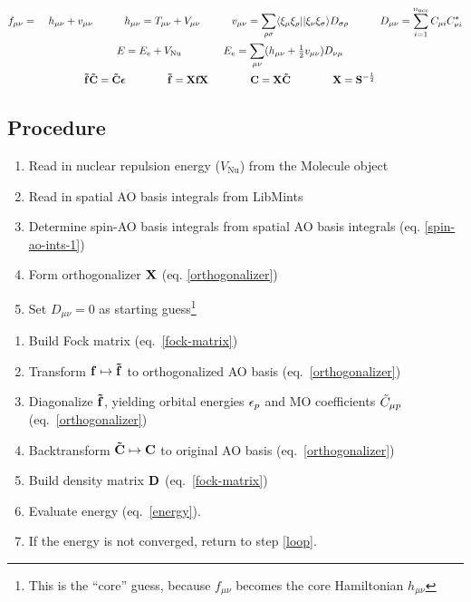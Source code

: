 \documentclass[fleqn]{article}
\begin{document}
\noindent
{}
\begin{gather}
\begin{aligned}
\label{fock-matrix}
&
  f_{\mu\nu}
=&\
  h_{\mu\nu}
+
  v_{\mu\nu}
\hspace{30pt}
  h_{\mu\nu}
=
  T_{\mu\nu}+V_{\mu\nu}
\hspace{30pt}
  v_{\mu\nu}
=
  \sum_{\rho\sigma}
  \langle\xi_\mu\xi_\rho||\xi_\nu\xi_\sigma\rangle
  D_{\sigma\rho}
\hspace{30pt}
  D_{\mu\nu}
=
  \sum_{i=1}^{n_\text{occ}}
  C_{\mu i} C_{\nu i}^*
\end{aligned}\\
\begin{aligned}
\label{energy}
&
  E
=
  E_e
+
  V_\mathrm{Nu}
&&\hspace{30pt}
  E_e
=
  \sum_{\mu\nu}
  (h_{\mu\nu}+\tfrac{1}{2}v_{\mu\nu})D_{\nu\mu}
\end{aligned}\\
\begin{aligned}
\label{orthogonalizer}
&
  \mathbf{\tilde{f}}\mathbf{\tilde{C}}
=
  \mathbf{\tilde{C}}\bm{\epsilon}
&&\hspace{30pt}
  \mathbf{\tilde{f}}
=
  \mathbf{X}\mathbf{f}\mathbf{X}
&&\hspace{30pt}
  \mathbf{C}
=
  \mathbf{X}
  \mathbf{\tilde{C}}
&&\hspace{30pt}
  \mathbf{X}
=
  \mathbf{S}^{-\frac{1}{2}}
\end{aligned}
\end{gather}


\subsection*{Procedure}

\begin{enumerate}
  \item Read in nuclear repulsion energy ($V_\mathrm{Nu}$) from the Molecule object
  \item Read in spatial AO basis integrals from LibMints
  \item Determine spin-AO basis integrals from spatial AO basis integrals (eq. \ref{spin-ao-ints-1})
  \item Form orthogonalizer $\mathbf{X}$ (eq. \ref{orthogonalizer})
  \item Set $D_{\mu\nu}=0$ as starting guess\footnote{This is the ``core'' guess, because $f_{\mu\nu}$ becomes the core Hamiltonian $h_{\mu\nu}$}
\end{enumerate}

\noindent
{}
\begin{enumerate}
  \item\label{loop} Build Fock matrix (eq.~\ref{fock-matrix})
  \item Transform $\mathbf{f}\mapsto\mathbf{\tilde{f}}$ to orthogonalized AO basis (eq.~\ref{orthogonalizer})
  \item Diagonalize $\mathbf{\tilde{f}}$, yielding orbital energies $\epsilon_p$ and MO coefficients $\tilde{C}_{\mu p}$ (eq.~\ref{orthogonalizer})
  \item Backtransform $\mathbf{\tilde{C}}\mapsto\mathbf{C}$ to original AO basis (eq.~\ref{orthogonalizer})
  \item Build density matrix $\mathbf{D}$ (eq.~\ref{fock-matrix})
  \item Evaluate energy (eq.~\ref{energy}).
  \item If the energy is not converged, return to step \ref{loop}.
\end{enumerate}
\end{document}
